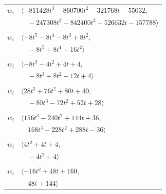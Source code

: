\documentclass[11pt]{article}
\begin{document}
\begin{longtable}{@{}ll@{}}
$w_i$ & $\langle -811428t^{3}-860700t^{2}-321768t-55032,$\\
 & $\quad -247308t^{3}-842400t^{2}-526632t-157788\rangle$\\
\addlinespace[2pt]
\multicolumn{2}{@{}p{0.97\textwidth}@{}}{$i=48$, $D_i=8$, $\rho_{ij}$: $15{:}2, \allowbreak 16{:}1, \allowbreak 23{:}2, \allowbreak 46{:}1, \allowbreak 60{:}2$}\\
$w_i$ & $\langle -8t^{5}-8t^{4}-8t^{3}+8t^{2},$\\
 & $\quad -8t^{5}+8t^{4}+16t^{2}\rangle$\\
\addlinespace[2pt]
\multicolumn{2}{@{}p{0.97\textwidth}@{}}{$i=49$, $D_i=4$, $\rho_{ij}$: $4{:}1, \allowbreak 18{:}1, \allowbreak 26{:}1, \allowbreak 63{:}2$}\\
$w_i$ & $\langle -8t^{3}-4t^{2}+4t+4,$\\
 & $\quad -8t^{3}+8t^{2}+12t+4\rangle$\\
\addlinespace[2pt]
\multicolumn{2}{@{}p{0.97\textwidth}@{}}{$i=50$, $D_i=32$, $\rho_{ij}$: $13{:}2, \allowbreak 14{:}2, \allowbreak 42{:}1, \allowbreak 52{:}1, \allowbreak 55{:}1, \allowbreak 56{:}1, \allowbreak 59{:}1$}\\
$w_i$ & $\langle 28t^{3}+76t^{2}+80t+40,$\\
 & $\quad -80t^{3}-72t^{2}+52t+28\rangle$\\
\addlinespace[2pt]
\multicolumn{2}{@{}p{0.97\textwidth}@{}}{$i=51$, $D_i=8$, $\rho_{ij}$: $4{:}2, \allowbreak 5{:}2, \allowbreak 6{:}2, \allowbreak 28{:}1, \allowbreak 43{:}1, \allowbreak 44{:}1$}\\
$w_i$ & $\langle 156t^{3}-240t^{2}+144t+36,$\\
 & $\quad 168t^{3}-228t^{2}+288t-36\rangle$\\
\addlinespace[2pt]
\multicolumn{2}{@{}p{0.97\textwidth}@{}}{$i=52$, $D_i=4$, $\rho_{ij}$: $10{:}1, \allowbreak 13{:}2, \allowbreak 15{:}1, \allowbreak 36{:}2, \allowbreak 46{:}1, \allowbreak 50{:}2$}\\
$w_i$ & $\langle 4t^{2}+4t+4,$\\
 & $\quad -4t^{2}+4\rangle$\\
\addlinespace[2pt]
\multicolumn{2}{@{}p{0.97\textwidth}@{}}{$i=53$, $D_i=16$, $\rho_{ij}$: $2{:}2, \allowbreak 7{:}2, \allowbreak 11{:}2, \allowbreak 12{:}1, \allowbreak 19{:}2, \allowbreak 37{:}1, \allowbreak 43{:}1, \allowbreak 54{:}2$}\\
$w_i$ & $\langle -16t^{2}+48t+160,$\\
 & $\quad 48t+144\rangle$\\

\end{longtable}
\end{document}
